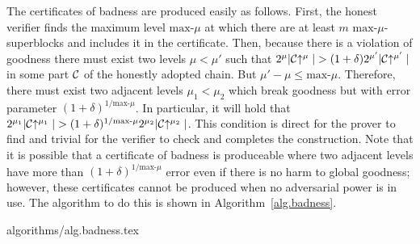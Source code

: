 The certificates of badness are produced easily as follows. First, the honest verifier
finds the maximum level $\text{max-}\mu$ at which there are at least $m$
$\text{max-}\mu$-superblocks and includes it in the certificate. Then, because
there is a violation of goodness there must exist two levels $\mu < \mu'$ such
that $2^\mu|\mathcal{C}\negthickspace\uparrow^\mu| > (1 + \delta)2^{\mu'}|\mathcal{C}\negthickspace\uparrow^{\mu'}|$
in some part $\mathcal{C}$ of the honestly adopted chain. But $\mu' - \mu \leq
\text{max-}\mu$. Therefore, there must exist two adjacent levels $\mu_1 < \mu_2$
which break goodness but with error parameter $(1 +
\delta)^{1/{\text{max-}\mu}}$. In particular, it will hold that
$2^{\mu_1}|\mathcal{C}\negthickspace\uparrow^{\mu_1}| > (1 +
\delta)^{1/{\text{max-}\mu}}2^{\mu_2}|\mathcal{C}\negthickspace\uparrow^{\mu_2}|$. This condition
is direct for the prover to find and trivial for the verifier to check and
completes the construction.
Note that it is possible that a certificate of
badness is produceable where two adjacent levels have more than $(1 +
\delta)^{1/{\text{max-}\mu}}$ error even if there is no harm to global goodness;
however, these certificates cannot be produced when no adversarial power is in
use. The algorithm to do this is shown in Algorithm~\ref{alg.badness}.

{algorithms/alg.badness.tex}
